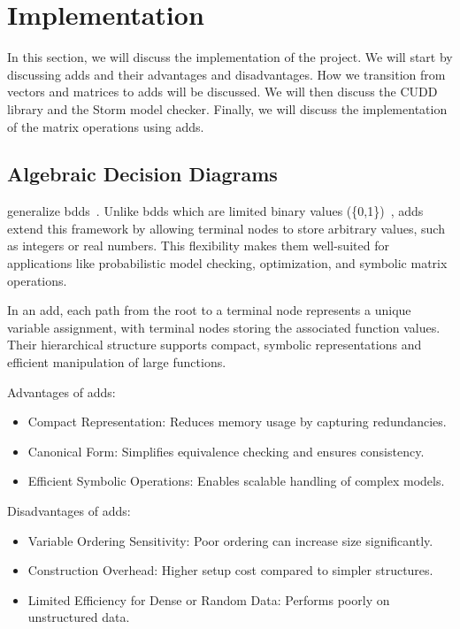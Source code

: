 \section{Implementation}\label{sec:implementation}
In this section, we will discuss the implementation of the project.
We will start by discussing \glspl{add} and their advantages and disadvantages.
How we transition from vectors and matrices to \glspl{add} will be discussed.
We will then discuss the CUDD library and the Storm model checker.
Finally, we will discuss the implementation of the matrix operations using \glspl{add}.


\subsection{Algebraic Decision Diagrams}\label{subsec:algebraic-decision-diagrams}
 generalize \glspl{bdd}~\cite{bahar1997algebric}.
Unlike \glspl{bdd} which are limited binary values (\{0,1\})~\cite{bryant1986graph}, \glspl{add} extend this framework by allowing terminal nodes to store arbitrary values, such as integers or real numbers. 
This flexibility makes them well-suited for applications like probabilistic model checking, optimization, and symbolic matrix operations.

In an \gls{add}, each path from the root to a terminal node represents a unique variable assignment, with terminal nodes storing the associated function values.
Their hierarchical structure supports compact, symbolic representations and efficient manipulation of large functions.

Advantages of \glspl{add}:
\begin{itemize}
\item Compact Representation: Reduces memory usage by capturing redundancies.
\item Canonical Form: Simplifies equivalence checking and ensures consistency.
\item Efficient Symbolic Operations: Enables scalable handling of complex models.
\end{itemize}

Disadvantages of \glspl{add}:
\begin{itemize}
\item Variable Ordering Sensitivity: Poor ordering can increase size significantly.
\item Construction Overhead: Higher setup cost compared to simpler structures.
\item Limited Efficiency for Dense or Random Data: Performs poorly on unstructured data.
\end{itemize}

